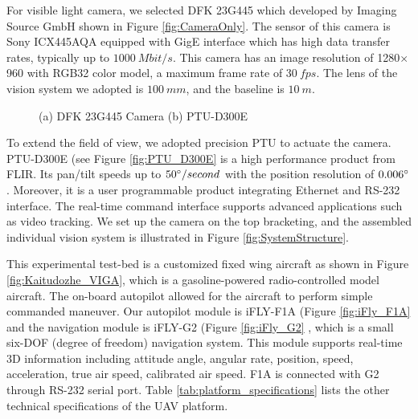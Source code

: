 \documentclass[journal,article,submit,moreauthors,pdftex,10pt,a4paper]{mdpi}
\begin{document}
For visible light camera, we selected DFK 23G445 which developed by Imaging Source GmbH shown in Figure  \ref{fig:CameraOnly}. The sensor of this camera is Sony ICX445AQA equipped with GigE interface which has high data transfer rates, typically up to $1000\ Mbit/s$. This camera has an image resolution of 1280$\times$960 with RGB32 color model, a maximum frame rate of $30\ fps$. The lens of the vision system we adopted is $100\ mm$, and the baseline is $10\ m$. 


\begin{figure}[!tb]
	\centering
	\caption{(a) DFK 23G445 Camera (b) PTU-D300E}
\end{figure}
To extend the field of view, we adopted precision PTU to actuate the camera. PTU-D300E (see Figure  \ref{fig:PTU_D300E} is a high performance product from FLIR. Its pan/tilt speeds up to $50\degree/second$ with the position resolution of $0.006\degree$. Moreover, it is a user programmable product integrating Ethernet  and RS-232 interface. The real-time command interface supports advanced applications such as video tracking. We set up the camera on the top bracketing, and the assembled individual vision system is illustrated in Figure  \ref{fig:SystemStructure}. 

This experimental test-bed is  a customized fixed wing aircraft as shown in Figure  \ref{fig:Kaitudozhe_VIGA}, which is a gasoline-powered radio-controlled model aircraft. The on-board autopilot allowed for the aircraft to perform simple commanded maneuver. Our autopilot module is iFLY-F1A (Figure  \ref{fig:iFly_F1A} and the navigation module is iFLY-G2 (Figure  \ref{fig:iFly_G2} \cite{IFLY}, which is a small six-DOF (degree of freedom) navigation system. This module supports real-time 3D information including attitude angle, angular rate, position, speed, acceleration, true air speed, calibrated air speed. F1A is connected with G2 through RS-232 serial port. Table \ref{tab:platform_specifications} lists the other technical specifications of the UAV platform.
\end{document}
